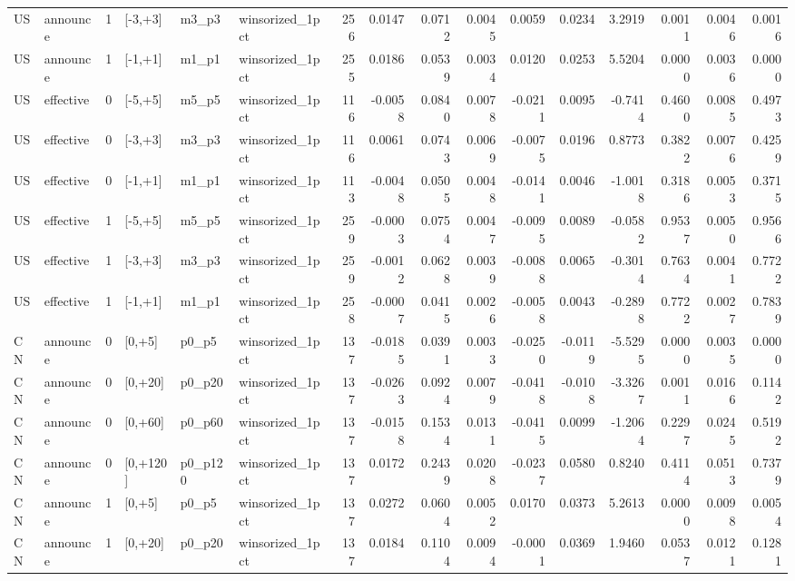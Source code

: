 \begin{tabular}{llrlllrrrrrrrrrr}
US & announce & 1 & [-3,+3] & m3_p3 & winsorized_1pct & 256 & 0.0147 & 0.0712 & 0.0045 & 0.0059 & 0.0234 & 3.2919 & 0.0011 & 0.0046 & 0.0016 \\
US & announce & 1 & [-1,+1] & m1_p1 & winsorized_1pct & 255 & 0.0186 & 0.0539 & 0.0034 & 0.0120 & 0.0253 & 5.5204 & 0.0000 & 0.0036 & 0.0000 \\
US & effective & 0 & [-5,+5] & m5_p5 & winsorized_1pct & 116 & -0.0058 & 0.0840 & 0.0078 & -0.0211 & 0.0095 & -0.7414 & 0.4600 & 0.0085 & 0.4973 \\
US & effective & 0 & [-3,+3] & m3_p3 & winsorized_1pct & 116 & 0.0061 & 0.0743 & 0.0069 & -0.0075 & 0.0196 & 0.8773 & 0.3822 & 0.0076 & 0.4259 \\
US & effective & 0 & [-1,+1] & m1_p1 & winsorized_1pct & 113 & -0.0048 & 0.0505 & 0.0048 & -0.0141 & 0.0046 & -1.0018 & 0.3186 & 0.0053 & 0.3715 \\
US & effective & 1 & [-5,+5] & m5_p5 & winsorized_1pct & 259 & -0.0003 & 0.0754 & 0.0047 & -0.0095 & 0.0089 & -0.0582 & 0.9537 & 0.0050 & 0.9566 \\
US & effective & 1 & [-3,+3] & m3_p3 & winsorized_1pct & 259 & -0.0012 & 0.0628 & 0.0039 & -0.0088 & 0.0065 & -0.3014 & 0.7634 & 0.0041 & 0.7722 \\
US & effective & 1 & [-1,+1] & m1_p1 & winsorized_1pct & 258 & -0.0007 & 0.0415 & 0.0026 & -0.0058 & 0.0043 & -0.2898 & 0.7722 & 0.0027 & 0.7839 \\
CN & announce & 0 & [0,+5] & p0_p5 & winsorized_1pct & 137 & -0.0185 & 0.0391 & 0.0033 & -0.0250 & -0.0119 & -5.5295 & 0.0000 & 0.0035 & 0.0000 \\
CN & announce & 0 & [0,+20] & p0_p20 & winsorized_1pct & 137 & -0.0263 & 0.0924 & 0.0079 & -0.0418 & -0.0108 & -3.3267 & 0.0011 & 0.0166 & 0.1142 \\
CN & announce & 0 & [0,+60] & p0_p60 & winsorized_1pct & 137 & -0.0158 & 0.1534 & 0.0131 & -0.0415 & 0.0099 & -1.2064 & 0.2297 & 0.0245 & 0.5192 \\
CN & announce & 0 & [0,+120] & p0_p120 & winsorized_1pct & 137 & 0.0172 & 0.2439 & 0.0208 & -0.0237 & 0.0580 & 0.8240 & 0.4114 & 0.0513 & 0.7379 \\
CN & announce & 1 & [0,+5] & p0_p5 & winsorized_1pct & 137 & 0.0272 & 0.0604 & 0.0052 & 0.0170 & 0.0373 & 5.2613 & 0.0000 & 0.0098 & 0.0054 \\
CN & announce & 1 & [0,+20] & p0_p20 & winsorized_1pct & 137 & 0.0184 & 0.1104 & 0.0094 & -0.0001 & 0.0369 & 1.9460 & 0.0537 & 0.0121 & 0.1281 \\

\end{tabular}
